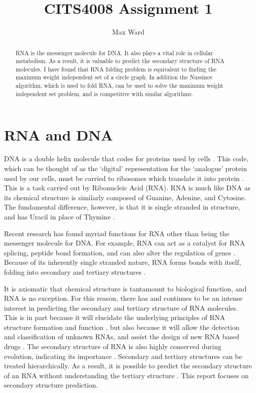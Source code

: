 \documentclass[12pt, a4paper]{article}
\title{CITS4008 Assignment 1}
\author{Max Ward}
\date{}
\begin{document}
\maketitle

\begin{abstract}
RNA is the messenger molecule for DNA. It also plays a vital role in cellular metabolism. As a result, it is valuable to predict the secondary structure of RNA molecules. I have found that RNA folding problem is equivalent to finding the maximum weight independent set of a circle graph. In addition the Nussinov algorithm, which is used to fold RNA, can be used to solve the maximum weight independent set problem, and is competitive with similar algorithms.
\end{abstract}

\section*{RNA and DNA} 
DNA is a double helix molecule that codes for proteins used by cells \cite{albertsessential}. This
code, which can be thought of as the `digital' representation for the `analogue'
protein used by our cells, must be carried to ribosomes which translate it into
protein \cite{albertsessential}. This is a task carried out by Ribonucleic Acid (RNA). RNA is much like DNA as its chemical structure is similarly composed of Guanine, Adenine, and Cytosine. The fundamental difference, however, is that it is single stranded in structure, and has Uracil in place of Thymine \cite{albertsessential}.

Recent research has found myriad functions for RNA other than being the messenger molecule for DNA. For example, RNA can act as a catalyst for RNA
splicing, peptide bond formation, and can also alter the regulation of genes
\cite{xu2012statistical}. Because of its inherently single stranded nature, RNA forms bonds with itself, folding into
secondary and tertiary structures \cite{conn1998rna}.

It is axiomatic that chemical structure is tantamount to biological function, and RNA is no exception. For this reason, there has and continues to be an intense
interest in predicting the secondary and tertiary structure of RNA
molecules. This is in part because it will elucidate the underlying principles of
RNA structure formation and function \cite{conn1998rna}, but also because it will allow the
detection and classification of unknown RNAs, and assist the design of new RNA based drugs \cite{condon2003problems}. The secondary structure of RNA
is also highly conserved during evolution, indicating its importance \cite{hofacker2008rna}. Secondary
and tertiary structures can be treated hierarchically. As a result, it is possible to
predict the secondary structure of an RNA without understanding the tertiary
structure \cite{tinoco1999rna}. This report focuses on secondary structure prediction.
\end{document}
